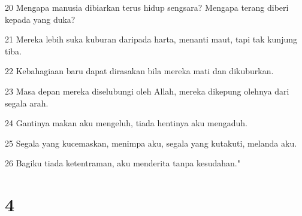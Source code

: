 \par 20 Mengapa manusia dibiarkan terus hidup sengsara? Mengapa terang diberi kepada yang duka?
\par 21 Mereka lebih suka kuburan daripada harta, menanti maut, tapi tak kunjung tiba.
\par 22 Kebahagiaan baru dapat dirasakan bila mereka mati dan dikuburkan.
\par 23 Masa depan mereka diselubungi oleh Allah, mereka dikepung olehnya dari segala arah.
\par 24 Gantinya makan aku mengeluh, tiada hentinya aku mengaduh.
\par 25 Segala yang kucemaskan, menimpa aku, segala yang kutakuti, melanda aku.
\par 26 Bagiku tiada ketentraman, aku menderita tanpa kesudahan."

\chapter{4}


